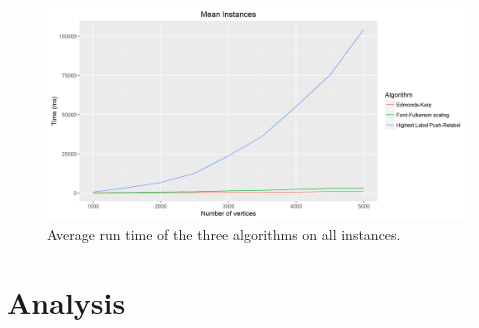 \begin{figure}[H]
\includegraphics[scale=0.5]{images/MeanInstancessize.png}
\caption{Average run time of the three algorithms on all instances.}
\label{fig:MeanInstancesize}
\end{figure}

\section{Analysis}
